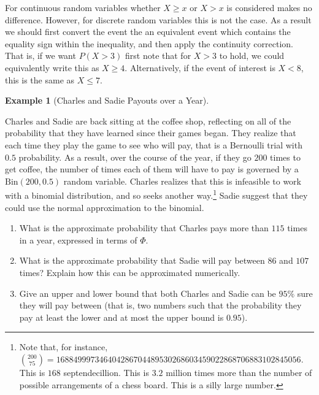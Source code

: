 \documentclass[
  letterpaper,
  DIV=11,
  numbers=noendperiod]{scrreprt}
\providecommand{\tightlist}{%
  \setlength{\itemsep}{0pt}\setlength{\parskip}{0pt}}\usepackage{longtable,booktabs,array}
\theoremstyle{definition}
\theoremstyle{definition}
\newtheorem{example}{Example}[chapter]
\theoremstyle{definition}
\theoremstyle{remark}
\begin{document}
For continuous random variables whether \(X \geq x\) or \(X > x\) is
considered makes no difference. However, for discrete random variables
this is not the case. As a result we should first convert the event the
an equivalent event which contains the equality sign within the
inequality, and then apply the continuity correction. That is, if we
want \(P(X > 3)\) first note that for \(X > 3\) to hold, we could
equivalently write this as \(X \geq 4\). Alternatively, if the event of
interest is \(X < 8\), this is the same as \(X \leq 7\).

\begin{example}[Charles and Sadie Payouts over a
Year]\protect\hypertarget{exm-normal-approximation}{}\label{exm-normal-approximation}

Charles and Sadie are back sitting at the coffee shop, reflecting on all
of the probability that they have learned since their games began. They
realize that each time they play the game to see who will pay, that is a
Bernoulli trial with \(0.5\) probability. As a result, over the course
of the year, if they go \(200\) times to get coffee, the number of times
each of them will have to pay is governed by a \(\text{Bin}(200, 0.5)\)
random variable. Charles realizes that this is infeasible to work with a
binomial distribution, and so seeks another way.\footnote{Note that, for
  instance,
  \(\binom{200}{75} = 168849997346404286704489530268603459022868706883102845056\).
  This is \(168\) septendecillion. This is \(3.2\) million times more
  than the number of possible arrangements of a chess board. This is a
  silly large number.} Sadie suggest that they could use the normal
approximation to the binomial.

\begin{enumerate}
\def\labelenumi{\alph{enumi}.}
\tightlist
\item
  What is the approximate probability that Charles pays more than
  \(115\) times in a year, expressed in terms of \(\Phi\).
\item
  What is the approximate probability that Sadie will pay between \(86\)
  and \(107\) times? Explain how this can be approximated numerically.
\item
  Give an upper and lower bound that both Charles and Sadie can be
  \(95\%\) sure they will pay between (that is, two numbers such that
  the probability they pay at least the lower and at most the upper
  bound is \(0.95\)).
\end{enumerate}

\begin{tcolorbox}[enhanced jigsaw, colback=white, colframe=quarto-callout-color-frame, arc=.35mm, leftrule=.75mm, rightrule=.15mm, opacityback=0, breakable, bottomrule=.15mm, left=2mm, toprule=.15mm]


\end{tcolorbox}
\end{example}
\end{document}
